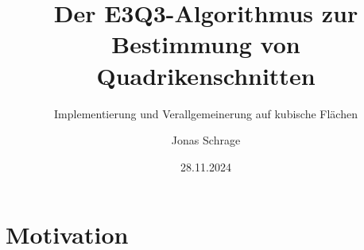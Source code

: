 \documentclass[11pt]{beamer}
\theoremstyle{custom}
\theoremstyle{custom}
\begin{document}
	\title[E3Q3-Algorithmus und kubische Flächen]{Der E3Q3-Algorithmus zur Bestimmung von Quadrikenschnitten}
	\subtitle{Implementierung und Verallgemeinerung auf kubische Flächen}
	\author{Jonas Schrage}
	\date{28.11.2024}
	\begin{frame}[plain]
		\maketitle
	\end{frame}
	\begin{frame}
		\tableofcontents
	\end{frame}
	\section{Motivation}
\end{document}

